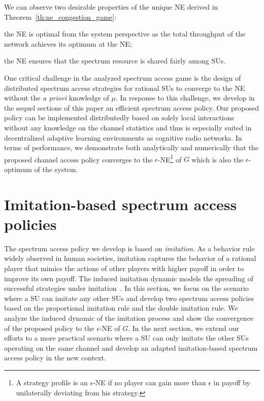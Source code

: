 \documentclass[12pt, onecolumn]{IEEEtran}
\theoremstyle{plain}
\theoremstyle{definition}
\begin{document}
We can observe two desirable properties of the unique NE derived in Theorem~\ref{th:ne_congestion_game}:

\begin{compactitem}
\item the NE is optimal from the system perspective as the total throughput of the network achieves its optimum at the NE;
\item the NE ensures that the spectrum resource is shared fairly among SUs.
\end{compactitem}

One critical challenge in the analyzed spectrum access game is the design of distributed spectrum access strategies for rational SUs to converge to the NE without the \textit{a priori} knowledge of $\mu$. In response to this challenge, we develop in the sequel sections of this paper an efficient spectrum access policy. Our proposed policy can be implemented distributedly based on solely local interactions without any knowledge on the channel statistics and thus is especially suited in decentralized adaptive learning environments as cognitive radio networks. In terms of performance, we demonstrate both analytically and numerically that the proposed channel access policy converges to the $\epsilon$-NE\footnote{A strategy profile is an $\epsilon$-NE if no player can gain more than $\epsilon$ in payoff by unilaterally deviating from his strategy.} of $G$ which is also the $\epsilon$-optimum of the system.

\section{Imitation-based spectrum access policies}
\label{sec:imitation}

The spectrum access policy we develop is based on \textit{imitation}. As a behavior rule widely observed in human societies, imitation captures the behavior of a rational player that mimics the actions of other players with higher payoff in order to improve its own payoff. The induced imitation dynamic models the spreading of successful strategies under imitation~\cite{Schlag96}. In this section, we focus on the scenario where a SU can imitate any other SUs and develop two spectrum access policies based on the proportional imitation rule and the double imitation rule. We analyze the induced dynamic of the imitation process and show the convergence of the proposed policy to the $\epsilon$-NE of $G$. In the next section, we extend our efforts to a more practical scenario where a SU can only imitate the other SUs operating on the same channel and develop an adapted imitation-based spectrum access policy in the new context.
\end{document}
